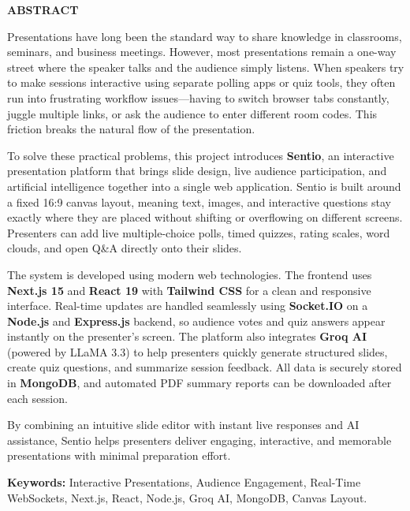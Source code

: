 \newpage
\thispagestyle{empty}

\begin{center}
{\Large\textbf{ABSTRACT}}
\end{center}

\vspace{1cm}

Presentations have long been the standard way to share knowledge in classrooms, seminars, and business meetings. However, most presentations remain a one-way street where the speaker talks and the audience simply listens. When speakers try to make sessions interactive using separate polling apps or quiz tools, they often run into frustrating workflow issues—having to switch browser tabs constantly, juggle multiple links, or ask the audience to enter different room codes. This friction breaks the natural flow of the presentation.

To solve these practical problems, this project introduces \textbf{Sentio}, an interactive presentation platform that brings slide design, live audience participation, and artificial intelligence together into a single web application. Sentio is built around a fixed 16:9 canvas layout, meaning text, images, and interactive questions stay exactly where they are placed without shifting or overflowing on different screens. Presenters can add live multiple-choice polls, timed quizzes, rating scales, word clouds, and open Q\&A directly onto their slides.

The system is developed using modern web technologies. The frontend uses \textbf{Next.js 15} and \textbf{React 19} with \textbf{Tailwind CSS} for a clean and responsive interface. Real-time updates are handled seamlessly using \textbf{Socket.IO} on a \textbf{Node.js} and \textbf{Express.js} backend, so audience votes and quiz answers appear instantly on the presenter's screen. The platform also integrates \textbf{Groq AI} (powered by LLaMA 3.3) to help presenters quickly generate structured slides, create quiz questions, and summarize session feedback. All data is securely stored in \textbf{MongoDB}, and automated PDF summary reports can be downloaded after each session.

By combining an intuitive slide editor with instant live responses and AI assistance, Sentio helps presenters deliver engaging, interactive, and memorable presentations with minimal preparation effort.

\vfill

\noindent
\textbf{Keywords:} Interactive Presentations, Audience Engagement, Real-Time WebSockets, Next.js, React, Node.js, Groq AI, MongoDB, Canvas Layout.